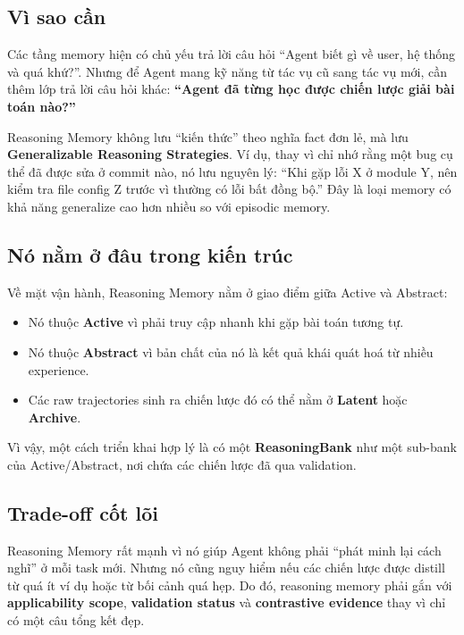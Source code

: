 \documentclass[a4paper,12pt]{article}
\begin{document}
\subsection*{Vì sao cần}

Các tầng memory hiện có chủ yếu trả lời câu hỏi ``Agent biết gì về user, hệ thống và quá khứ?''. Nhưng để Agent mang kỹ năng từ tác vụ cũ sang tác vụ mới, cần thêm lớp trả lời câu hỏi khác: \textbf{``Agent đã từng học được chiến lược giải bài toán nào?''}

Reasoning Memory không lưu ``kiến thức'' theo nghĩa fact đơn lẻ, mà lưu \textbf{Generalizable Reasoning Strategies}. Ví dụ, thay vì chỉ nhớ rằng một bug cụ thể đã được sửa ở commit nào, nó lưu nguyên lý: ``Khi gặp lỗi X ở module Y, nên kiểm tra file config Z trước vì thường có lỗi bất đồng bộ.'' Đây là loại memory có khả năng generalize cao hơn nhiều so với episodic memory.

\subsection*{Nó nằm ở đâu trong kiến trúc}

Về mặt vận hành, Reasoning Memory nằm ở giao điểm giữa Active và Abstract:
\begin{itemize}
    \item Nó thuộc \textbf{Active} vì phải truy cập nhanh khi gặp bài toán tương tự.
    \item Nó thuộc \textbf{Abstract} vì bản chất của nó là kết quả khái quát hoá từ nhiều experience.
    \item Các raw trajectories sinh ra chiến lược đó có thể nằm ở \textbf{Latent} hoặc \textbf{Archive}.
\end{itemize}

Vì vậy, một cách triển khai hợp lý là có một \textbf{ReasoningBank} như một sub-bank của Active/Abstract, nơi chứa các chiến lược đã qua validation.

\subsection*{Trade-off cốt lõi}

Reasoning Memory rất mạnh vì nó giúp Agent không phải ``phát minh lại cách nghĩ'' ở mỗi task mới. Nhưng nó cũng nguy hiểm nếu các chiến lược được distill từ quá ít ví dụ hoặc từ bối cảnh quá hẹp. Do đó, reasoning memory phải gắn với \textbf{applicability scope}, \textbf{validation status} và \textbf{contrastive evidence} thay vì chỉ có một câu tổng kết đẹp.
\end{document}
